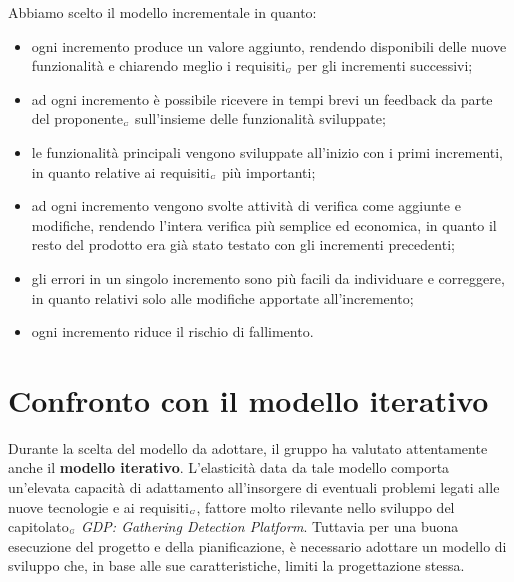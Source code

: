 Abbiamo scelto il modello incrementale in quanto:
\begin{itemize}
	\item ogni incremento produce un valore aggiunto, rendendo disponibili delle nuove funzionalità e chiarendo meglio i requisiti$_{\scaleto{G}{3pt}}$ per gli incrementi successivi;
	\item ad ogni incremento è possibile ricevere in tempi brevi un feedback da parte del proponente$_{\scaleto{G}{3pt}}$ sull'insieme delle funzionalità sviluppate;
	\item le funzionalità principali vengono sviluppate all'inizio con i primi incrementi, in quanto relative ai requisiti$_{\scaleto{G}{3pt}}$ più importanti;
	\item ad ogni incremento vengono svolte attività di verifica come aggiunte e modifiche, rendendo l'intera verifica più semplice ed economica, in quanto il resto del prodotto era già stato testato con gli incrementi precedenti;
	\item gli errori in un singolo incremento sono più facili da individuare e correggere, in quanto relativi solo alle modifiche apportate all'incremento;
	\item ogni incremento riduce il rischio di fallimento.
\end{itemize}

\section{Confronto con il modello iterativo}\label{ModelloDiSviluppoConfrontoConIlModelloIterativo}
Durante la scelta del modello da adottare, il gruppo ha valutato attentamente anche il \textbf{modello iterativo}.
L'elasticità data da tale modello comporta un'elevata capacità di adattamento all'insorgere di eventuali problemi legati alle nuove tecnologie e ai requisiti$_{\scaleto{G}{3pt}}$, fattore molto rilevante nello sviluppo del capitolato$_{\scaleto{G}{3pt}}$ \textit{GDP: Gathering Detection Platform}.
Tuttavia per una buona esecuzione del progetto e della pianificazione, è necessario adottare un modello di sviluppo che, in base alle sue caratteristiche, limiti la progettazione stessa.

